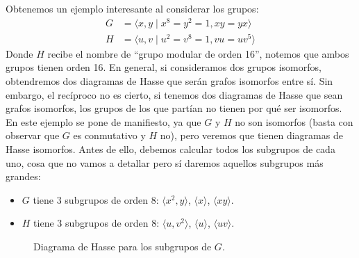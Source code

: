 \begin{ejemplo}
    Obtenemos un ejemplo interesante al considerar los grupos:
    \begin{align*}
        G &= \langle x,y \mid x^8=y^2=1, xy=yx \rangle \\
        H &= \langle u,v \mid u^2 = v^8 = 1, vu = uv^5 \rangle 
    \end{align*}
    Donde $H$ recibe el nombre de ``grupo modular de orden 16'', notemos que ambos grupos tienen orden 16. En general, si consideramos dos grupos isomorfos, obtendremos dos diagramas de Hasse que serán grafos isomorfos entre sí. Sin embargo, el recíproco no es cierto, si tenemos dos diagramas de Hasse que sean grafos isomorfos, los grupos de los que partían no tienen por qué ser isomorfos. En este ejemplo se pone de manifiesto, ya que $G$ y $H$ no son isomorfos (basta con observar que $G$ es conmutativo y $H$ no), pero veremos que tienen diagramas de Hasse isomorfos. Antes de ello, debemos calcular todos los subgrupos de cada uno, cosa que no vamos a detallar pero sí daremos aquellos subgrupos más grandes:
    \begin{itemize}
        \item $G$ tiene 3 subgrupos de orden 8: $\langle x^2,y \rangle $, $\langle x \rangle $, $\langle xy \rangle $.
        \item $H$ tiene 3 subgrupos de orden 8: $\langle u, v^2 \rangle $, $\langle u \rangle $, $\langle uv \rangle $.
    \end{itemize}

\begin{figure}[H]
    \centering
    \caption{Diagrama de Hasse para los subgrupos de $G$.}
\end{figure}


\end{ejemplo}
